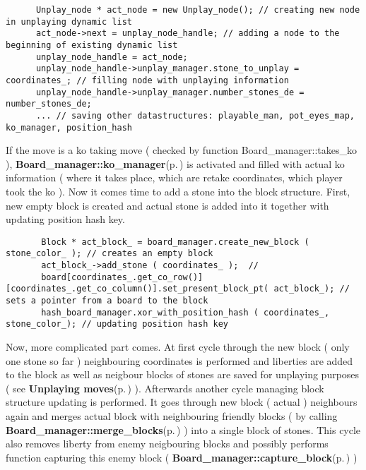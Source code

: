 \footnotesize\begin{verbatim}      Unplay_node * act_node = new Unplay_node(); // creating new node in unplaying dynamic list 
      act_node->next = unplay_node_handle; // adding a node to the beginning of existing dynamic list 
      unplay_node_handle = act_node;
      unplay_node_handle->unplay_manager.stone_to_unplay = coordinates_; // filling node with unplaying information 
      unplay_node_handle->unplay_manager.number_stones_de = number_stones_de;
      ... // saving other datastructures: playable_man, pot_eyes_map, ko_manager, position_hash
\end{verbatim}
\normalsize


If the move is a ko taking move ( checked by function Board\_\-manager::takes\_\-ko ), {\bf Board\_\-manager::ko\_\-manager}{\rm (p.\,\pageref{classBoard__manager_o3})} is activated and filled with actual ko information ( where it takes place, which are retake coordinates, which player took the ko ). Now it comes time to add a stone into the block structure. First, new empty block is created and actual stone is added into it together with updating position hash key. 

\footnotesize\begin{verbatim}       Block * act_block_ = board_manager.create_new_block ( stone_color_ ); // creates an empty block
       act_block_->add_stone ( coordinates_ );  // 
       board[coordinates_.get_co_row()][coordinates_.get_co_column()].set_present_block_pt( act_block_); // sets a pointer from a board to the block
       hash_board_manager.xor_with_position_hash ( coordinates_, stone_color_); // updating position hash key 
\end{verbatim}
\normalsize


Now, more complicated part comes. At first cycle through the new block ( only one stone so far ) neighbouring coordinates is performed and liberties are added to the block as well as neigbour blocks of stones are saved for unplaying purposes ( see {\bf Unplaying moves}{\rm (p.\,\pageref{page_6_page_6__sec_4})} ). Afterwards another cycle managing block structure updating is performed. It goes through new block ( actual ) neighbours again and merges actual block with neighbouring friendly blocks ( by calling {\bf Board\_\-manager::merge\_\-blocks}{\rm (p.\,\pageref{classBoard__manager_a5})} ) into a single block of stones. This cycle also removes liberty from enemy neigbouring blocks and possibly performs function capturing this enemy block ( {\bf Board\_\-manager::capture\_\-block}{\rm (p.\,\pageref{classBoard__manager_a2})} ) 

